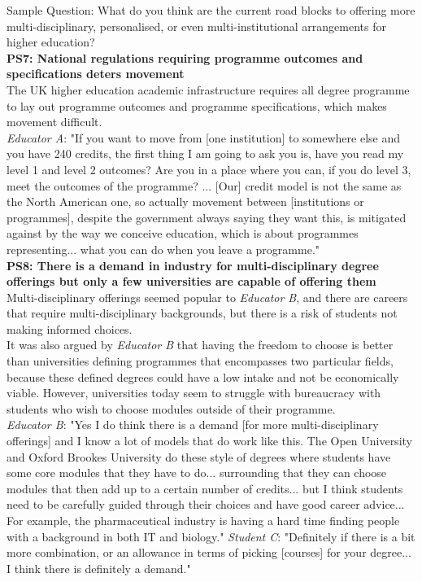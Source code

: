 Sample Question: What do you think are the current road blocks to offering more multi-disciplinary, 
personalised, or even multi-institutional arrangements for higher education?\vspace{0.25cm}\\
\textbf{PS7: National regulations requiring programme outcomes and specifications deters movement}\\
The UK higher education academic infrastructure requires all degree programme to lay out 
programme outcomes and programme specifications, which makes movement difficult.\\
\textit{Educator A}: "If you want to move from [one institution] to somewhere else and you have 240 credits, 
the first thing I am going to ask you is, have you read my level 1 and level 2 outcomes? Are you 
in a place where you can, if you do level 3, meet the outcomes of the programme? ... 
[Our] credit model is not the same as the North American one, so actually movement 
between [institutions or programmes], despite the government always saying they want this, 
is mitigated against by the way we conceive education, which is about programmes representing... 
what you can do when you leave a programme."
\vspace{0.25cm}\\
\textbf{PS8: There is a demand in industry for multi-disciplinary degree offerings but only a few 
universities are capable of offering them}\\
Multi-disciplinary offerings seemed popular to \textit{Educator B}, and there are careers that require 
multi-disciplinary backgrounds, but there is a risk of students not making informed choices.\\
It was also argued by \textit{Educator B} that having the freedom to choose is better than universities 
defining programmes that encompasses two particular fields, because these defined degrees could have 
a low intake and not be economically viable. However, universities today seem to struggle with bureaucracy 
with students who wish to choose modules outside of their programme.\\
\textit{Educator B}: "Yes I do think there is a demand [for more multi-disciplinary offerings] and I know 
a lot of models that do work like this. The Open University and Oxford Brookes University do these 
style of degrees where students have some core modules that they have to do... surrounding that 
they can choose modules that then add up to a certain number of credits... but I think students 
need to be carefully guided through their choices and have good career advice... For example, 
the pharmaceutical industry is having a hard time finding people with a background in both IT and biology."
\textit{Student C}: "Definitely if there is a bit more combination, or an allowance in terms of 
picking [courses] for your degree... I think there is definitely a demand."

